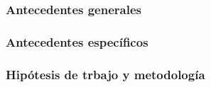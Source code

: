\documentclass[11pt,letterpaper]{article}
\begin{document}
\subsubsection{Antecedentes generales}

%
%

\subsubsection{Antecedentes específicos}

%
%
\subsubsection{Hipótesis de trbajo y metodología}
\end{document}
